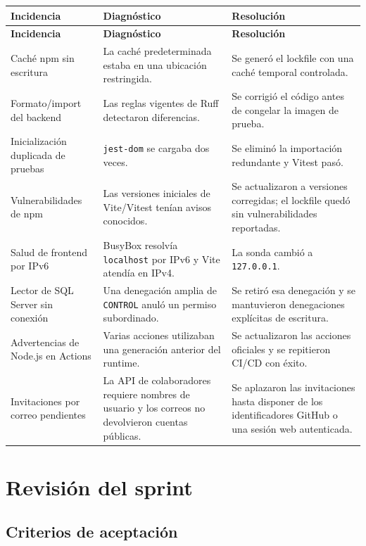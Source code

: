 \documentclass[11pt,letterpaper]{article}
\newcommand{\file}[1]{\texttt{#1}}
\begin{document}
\begin{longtable}{@{}p{}p{}p{}@{}}
  \toprule
  \textbf{Incidencia} & \textbf{Diagnóstico} & \textbf{Resolución} \\
  \midrule
  \endfirsthead
  \toprule
  \textbf{Incidencia} & \textbf{Diagnóstico} & \textbf{Resolución} \\
  \midrule
  \endhead
  Caché npm sin escritura & La caché predeterminada estaba en una ubicación restringida. & Se generó el lockfile con una caché temporal controlada. \\
  Formato/import del backend & Las reglas vigentes de Ruff detectaron diferencias. & Se corrigió el código antes de congelar la imagen de prueba. \\
  Inicialización duplicada de pruebas & \file{jest-dom} se cargaba dos veces. & Se eliminó la importación redundante y Vitest pasó. \\
  Vulnerabilidades de npm & Las versiones iniciales de Vite/Vitest tenían avisos conocidos. & Se actualizaron a versiones corregidas; el lockfile quedó sin vulnerabilidades reportadas. \\
  Salud de frontend por IPv6 & BusyBox resolvía \file{localhost} por IPv6 y Vite atendía en IPv4. & La sonda cambió a \file{127.0.0.1}. \\
  Lector de SQL Server sin conexión & Una denegación amplia de \file{CONTROL} anuló un permiso subordinado. & Se retiró esa denegación y se mantuvieron denegaciones explícitas de escritura. \\
  Advertencias de Node.js en Actions & Varias acciones utilizaban una generación anterior del runtime. & Se actualizaron las acciones oficiales y se repitieron CI/CD con éxito. \\
  Invitaciones por correo pendientes & La API de colaboradores requiere nombres de usuario y los correos no devolvieron cuentas públicas. & Se aplazaron las invitaciones hasta disponer de los identificadores GitHub o una sesión web autenticada. \\
  \bottomrule
\end{longtable}

\section{Revisión del sprint}

\subsection{Criterios de aceptación}
\end{document}
